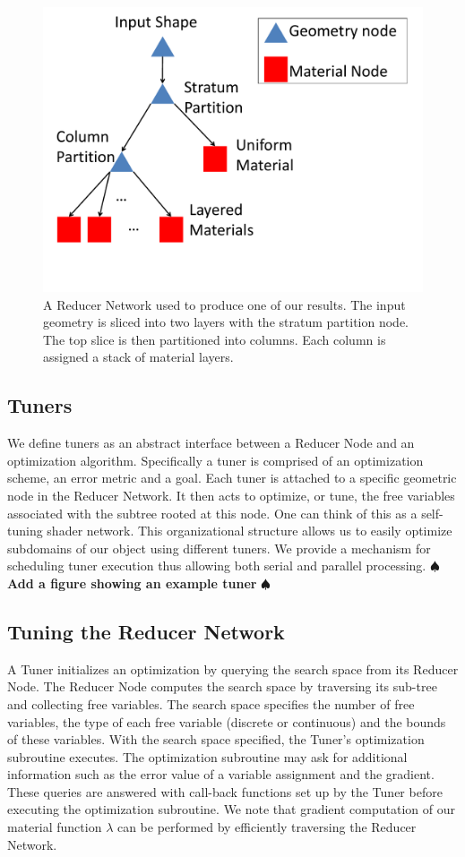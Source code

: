 \documentclass[annual]{acmsiggraph}
\newcommand{\note}[1]{\marginpar{\LARGE $\spadesuit$}
			$\spadesuit$ {\bf #1} $\spadesuit$}
\begin{document}
\begin{figure}[h]
\includegraphics[scale=0.3]{figure/redNetwork.pdf}
\caption{A Reducer Network used to produce one of our results.
The input geometry is sliced into two layers with the stratum partition node.
The top slice is then partitioned into columns. Each column is assigned
a stack of material layers.}
\label{fig:red1}
\end{figure}

\subsection{Tuners}
We define tuners as an abstract interface between a Reducer Node and an optimization algorithm.  Specifically a tuner is comprised of an optimization scheme, an error metric and a goal. Each tuner is attached to a specific geometric node in the Reducer Network. It then acts to optimize, or tune, the free variables associated with the subtree rooted at this node. One can think of this as a self-tuning shader network.  This organizational structure allows us to easily optimize subdomains of our object using different tuners. We provide a mechanism for scheduling tuner execution thus allowing both serial and parallel processing. \note{Add a figure showing an example tuner}
\subsection{Tuning the Reducer Network}
A Tuner initializes an optimization by querying the search space from its Reducer Node.
The Reducer Node computes the search space by traversing its sub-tree and collecting
free variables. The search space specifies the number of free variables, the type of each free variable
(discrete or continuous) and the bounds of these variables. With the search space specified, the Tuner's optimization subroutine executes. The optimization subroutine may ask for additional information such as
the error value of a variable assignment and the gradient. These queries are answered
with call-back functions set up by the Tuner before executing the optimization subroutine. We note that gradient computation of our material function $\lambda$ can be performed by efficiently traversing the Reducer Network.
\end{document}
